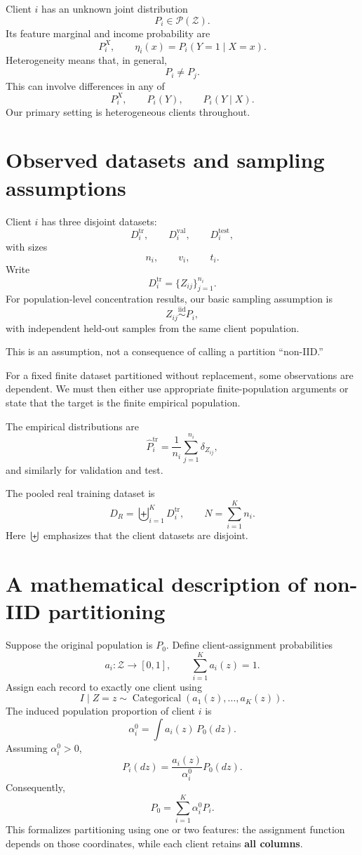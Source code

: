 \documentclass[11pt,a4paper]{article}
\begin{document}
Client $i$ has an unknown joint distribution
\[
P_i\in\mathcal P(\mathcal Z).
\]
Its feature marginal and income probability are
\[
P_i^X,\qquad\eta_i(x)=P_i(Y=1\mid X=x).
\]
Heterogeneity means that, in general,
\[
P_i\neq P_j.
\]
This can involve differences in any of
\[
P_i^X,\qquad P_i(Y),\qquad P_i(Y\mid X).
\]
Our primary setting is heterogeneous clients throughout.

\section{Observed datasets and sampling assumptions}
Client $i$ has three disjoint datasets:
\[
D_i^{\mathrm{tr}},\qquad D_i^{\mathrm{val}},\qquad D_i^{\mathrm{test}},
\]
with sizes
\[
n_i,\qquad v_i,\qquad t_i.
\]
Write
\[
D_i^{\mathrm{tr}}=\{Z_{ij}\}_{j=1}^{n_i}.
\]
For population-level concentration results, our basic sampling assumption is
\[
Z_{ij}\overset{\mathrm{iid}}{\sim}P_i,
\]
with independent held-out samples from the same client population.

This is an assumption, not a consequence of calling a partition ``non-IID.''

For a fixed finite dataset partitioned without replacement, some observations are dependent. We must then either use appropriate finite-population arguments or state that the target is the finite empirical population.

The empirical distributions are
\[
\widehat P_i^{\mathrm{tr}}=\frac1{n_i}\sum_{j=1}^{n_i}\delta_{Z_{ij}},
\]
and similarly for validation and test.

The pooled real training dataset is
\[
D_R=\biguplus_{i=1}^{K}D_i^{\mathrm{tr}},\qquad N=\sum_{i=1}^{K}n_i.
\]
Here $\biguplus$ emphasizes that the client datasets are disjoint.

\section{A mathematical description of non-IID partitioning}
Suppose the original population is $P_0$. Define client-assignment probabilities
\[
a_i:\mathcal Z\rightarrow[0,1],\qquad\sum_{i=1}^{K}a_i(z)=1.
\]
Assign each record to exactly one client using
\[
I\mid Z=z\sim\operatorname{Categorical}\left(a_1(z),\ldots,a_K(z)\right).
\]
The induced population proportion of client $i$ is
\[
\alpha_i^0=\int a_i(z)\,P_0(dz).
\]
Assuming $\alpha_i^0>0$,
\[
\boxed{P_i(dz)=\frac{a_i(z)}{\alpha_i^0}P_0(dz).}
\]
Consequently,
\[
\boxed{P_0=\sum_{i=1}^{K}\alpha_i^0P_i.}
\]
This formalizes partitioning using one or two features: the assignment function depends on those coordinates, while each client retains \textbf{all columns}.
\end{document}
